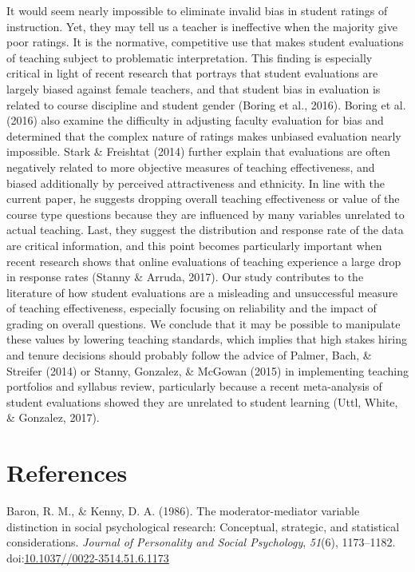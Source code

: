 \documentclass[man]{apa6}
\theoremstyle{definition}
\theoremstyle{definition}
\theoremstyle{definition}
\theoremstyle{remark}
\begin{document}
It would seem nearly impossible to eliminate invalid bias in student
ratings of instruction. Yet, they may tell us a teacher is ineffective
when the majority give poor ratings. It is the normative, competitive
use that makes student evaluations of teaching subject to problematic
interpretation. This finding is especially critical in light of recent
research that portrays that student evaluations are largely biased
against female teachers, and that student bias in evaluation is related
to course discipline and student gender (Boring et al., 2016). Boring et
al. (2016) also examine the difficulty in adjusting faculty evaluation
for bias and determined that the complex nature of ratings makes
unbiased evaluation nearly impossible. Stark \& Freishtat (2014) further
explain that evaluations are often negatively related to more objective
measures of teaching effectiveness, and biased additionally by perceived
attractiveness and ethnicity. In line with the current paper, he
suggests dropping overall teaching effectiveness or value of the course
type questions because they are influenced by many variables unrelated
to actual teaching. Last, they suggest the distribution and response
rate of the data are critical information, and this point becomes
particularly important when recent research shows that online
evaluations of teaching experience a large drop in response rates
(Stanny \& Arruda, 2017). Our study contributes to the literature of how
student evaluations are a misleading and unsuccessful measure of
teaching effectiveness, especially focusing on reliability and the
impact of grading on overall questions. We conclude that it may be
possible to manipulate these values by lowering teaching standards,
which implies that high stakes hiring and tenure decisions should
probably follow the advice of Palmer, Bach, \& Streifer (2014) or
Stanny, Gonzalez, \& McGowan (2015) in implementing teaching portfolios
and syllabus review, particularly because a recent meta-analysis of
student evaluations showed they are unrelated to student learning (Uttl,
White, \& Gonzalez, 2017).

\newpage

\section{References}\label{references}

\setlength{\parindent}{-0.5in} \setlength{\leftskip}{0.5in}

\hypertarget{refs}{}
\hypertarget{ref-Baron1986}{}
Baron, R. M., \& Kenny, D. A. (1986). The moderator-mediator variable
distinction in social psychological research: Conceptual, strategic, and
statistical considerations. \emph{Journal of Personality and Social
Psychology}, \emph{51}(6), 1173--1182.
doi:\href{https://doi.org/10.1037//0022-3514.51.6.1173}{10.1037//0022-3514.51.6.1173}
\end{document}
